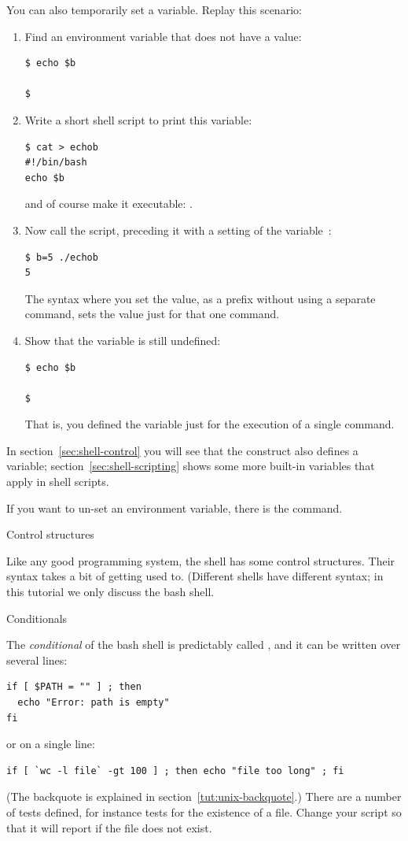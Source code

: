 You can also temporarily set a variable. Replay this scenario:
\begin{enumerate}
\item Find an environment variable that does not have a value:
\begin{lstlisting}
$ echo $b

$
\end{lstlisting}
\item Write a short shell script to print this variable:
\begin{lstlisting}
$ cat > echob
#!/bin/bash
echo $b
\end{lstlisting}
and of course make it executable: .
\item Now call the script, preceding it with a setting of the variable~:
\begin{lstlisting}
$ b=5 ./echob
5
\end{lstlisting}
The syntax where you set the value, as a prefix without using a separate
command, sets the value just for that one command.
\item Show that the variable is still undefined:
\begin{lstlisting}
$ echo $b

$
\end{lstlisting}
That is, you defined the variable just for the execution of a single command.
\end{enumerate}

In  section~\ref{sec:shell-control} you will see that the  construct
also defines a variable; section~\ref{sec:shell-scripting}
shows some more built-in variables that apply in shell scripts.

If you want to un-set an environment variable,
there is the  command.


 {Control structures}
\label{sec:shell-control}

Like any good programming system, the shell has some control
structures. Their syntax takes a bit of getting used to. (Different
shells have different syntax; in this tutorial we only discuss the
bash shell.

 {Conditionals}

The \emph{conditional} of the bash shell is predictably called
, and it can be written over several
lines:
\begin{lstlisting}
if [ $PATH = "" ] ; then
  echo "Error: path is empty"
fi
\end{lstlisting}
or on a single line:
\begin{lstlisting}
if [ `wc -l file` -gt 100 ] ; then echo "file too long" ; fi
\end{lstlisting}
(The backquote is explained in section~\ref{tut:unix-backquote}.)
There are a number of tests defined, for instance 
tests for the existence of a file. Change your script so that it will
report  if the file does not exist.

